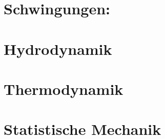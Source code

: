\documentclass[final, 12pt]{article}
\begin{document}
  



\section{Schwingungen:}


\section{Hydrodynamik}


\section{Thermodynamik}


\section{Statistische Mechanik}


\newpage
\end{document}
